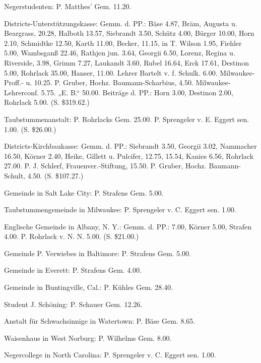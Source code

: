 Negerstudenten: P. Matthes’ Gem. 11.20.

Districts-Unterstützungskasse: Gemm. d. PP.: Bäse 4.87, Bräm, Augusta u. Beargrass, 20.28, Halboth 13.57, Siebrandt 3.50, Schütz 4.00, Bürger 10.00, Horn 2.10, Schmidtke 12.50, Karth 11.00, Becker,  11.15, in T. Wilson 1.95, Fiehler 5.00, Wambsganß 22.46, Rathjen jun. 3.64, Georgii 6.50, Lorenz, Regina u. Riverside, 3.98, Grimm 7.27, Laukandt 3.60, Rubel 16.64, Erck 17.61, Destinon 5.00, Rohrlack 35.00, Hanser,  11.00. Lehrer Bartelt v. f. Schulk. 6.00. Milwaukee-Proff.- u.  10.25. P. Gruber, Hochz. Baumann-Scharbius, 4.50. Milwaukee-Lehrerconf. 5.75. „E. B.“ 50.00. Beiträge d. PP.: Horn 3.00, Destinon 2.00, Rohrlack 5.00. (S. \$319.62.)

Taubstummenanstalt: P. Rohrlacks Gem. 25.00. P. Sprengeler v. E. Eggert sen. 1.00. (S. \$26.00.)

Districts-Kirchbaukasse: Gemm. d. PP.: Siebrandt 3.50, Georgii 3.02, Nammacher 16.50, Körner 2.40, Heike, Gillett u. Pulcifer, 12.75,  15.54, Kanies 6.56, Rohrlack 27.00. P. J. Schlerf, Frauenver.-Stiftung, 15.50. P. Gruber, Hochz. Baumann-Schult, 4.50. (S. \$107.27.)

Gemeinde in Salt Lake City: P. Strafens Gem. 5.00.

Taubstummengemeinde in Milwaukee: P. Sprengeler v. C. Eggert sen. 1.00.

Englische Gemeinde in Albany, N. Y.: Gemm. d. PP.:  7.00, Körner 5.00, Strafen 4.00. P. Rohrlack v. N. N. 5.00. (S. \$21.00.)

Gemeinde P. Verwiebes in Baltimore: P. Strafens Gem. 5.00.

Gemeinde in Everett: P. Strafens Gem. 4.00.

Gemeinde in Buntingville, Cal.: P. Kühles Gem. 28.40.

Student J. Schöning: P. Schauer Gem. 12.26.

Anstalt für Schwachsinnige in Watertown: P. Bäse Gem. 8.65.

Waisenhaus in West Norburg: P. Wilhelms Gem. 8.00.

Negercollege in North Carolina: P. Sprengeler v. C. Eggert sen. 1.00.

